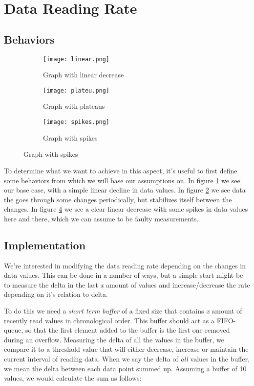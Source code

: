 

\section{Data Reading Rate}
\subsection{Behaviors}

\begin{figure}[H]
\centering
	\begin{subfigure}[b]{0.3\textwidth}
    \texttt{[image: linear.png]}
    \caption{Graph with linear decrease}
    \label{fig:linear}
	\end{subfigure}
	\begin{subfigure}[b]{0.3\textwidth}
    \texttt{[image: plateu.png]}
    \caption{Graph with plateaus}
    \label{fig:plat}
	\end{subfigure}
	\begin{subfigure}[b]{0.3\textwidth}
    \texttt{[image: spikes.png]}
    \caption{Graph with spikes}
    \label{fig:spikes}
	\end{subfigure}
\end{figure}

To determine what we want to achieve in this aspect, it's useful to first define some behaviors from which we will base our assumptions on. In figure \ref{fig:linear} we see our base case, with a simple linear decline in data values. In figure \ref{fig:plat} we see data the goes through some changes periodically, but stabilizes itself between the changes. In figure \ref{fig:spikes} we see a clear linear decrease with some spikes in data values here and there, which we can assume to be faulty measurements.

\subsection{Implementation}
We're interested in modifying the data reading rate depending on the changes in data values. This can be done in a number of ways, but a simple start might be to measure the delta in the last \textit{x} amount of values and increase/decrease the rate depending on it's relation to delta. 

To do this we need a \textit{short term buffer} of a fixed size that contains \textit{x} amount of recently read values in chronological order. This buffer should act as a FIFO-queue, so that the first element added to the buffer is the first one removed during an overflow. Measuring the delta of all the values in the buffer, we compare it to a threshold value that will either decrease, increase or maintain the current interval of reading data. When we say the delta of \textit{all} values in the buffer, we mean the delta between each data point summed up. Assuming a buffer of 10 values, we would calculate the sum as follows:

